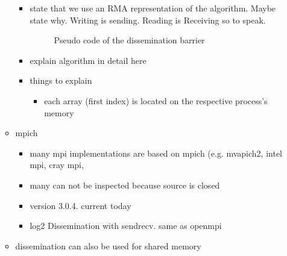 \documentclass[a4paper, 10pt]{article}
\begin{document}
\begin{enumerate}
\begin{itemize}
\begin{itemize}
			\item state that we use an RMA representation of the algorithm. Maybe state why. Writing is sending. Reading is Receiving so to speak.
				\begin{figure}[htbp]
					\centering
					
					\caption{Pseudo code of the dissemination barrier}
					\label{fig:dissemination-no-reset}
				\end{figure}
			\item explain algorithm in detail here
			\item things to explain
				\begin{itemize}
					\item each array (first index) is located on the respective process's memory
				\end{itemize}

		\end{itemize}
	\item mpich
		\begin{itemize}
			\item many mpi implementations are based on mpich (e.g. mvapich2, intel mpi, cray mpi,
			\item many can not be inspected because source is closed
			\item version 3.0.4. current today
			\item log2 Dissemination with sendrecv. same as openmpi
		\end{itemize}
	\item dissemination can also be used for shared memory\cite{hoefler2013}
\end{itemize}


\end{enumerate}
\end{document}
